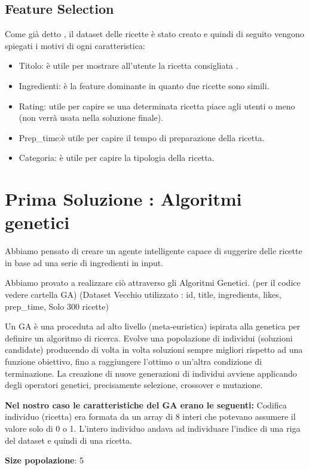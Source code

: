 \documentclass[12pt]{report}
\begin{document}
\section{Feature Selection}
Come già detto , il dataset delle ricette è stato creato e quindi di seguito vengono spiegati i motivi di ogni caratteristica:
\begin{itemize}
	\item Titolo: è utile per mostrare all’utente la ricetta consigliata .
	\item Ingredienti: è la feature dominante in quanto due ricette sono simili.
	\item Rating: utile per capire se una determinata ricetta piace agli utenti o meno (non verrà usata nella soluzione finale).
	\item Prep\_time:è utile per capire il tempo di preparazione della ricetta.
	\item Categoria: è utile per capire la tipologia della ricetta.
 \end{itemize}

\chapter{Prima Soluzione : Algoritmi genetici}

Abbiamo pensato di creare un agente intelligente capace di suggerire delle ricette in base ad una serie di ingredienti in input.

Abbiamo provato a realizzare ciò attraverso gli Algoritmi Genetici. (per il codice vedere cartella GA) (Dataset Vecchio utilizzato : id, title, ingredients, likes, prep\_time, Solo 300 ricette)

Un GA è una proceduta ad alto livello (meta-euristica) ispirata alla genetica per definire un algoritmo di ricerca. Evolve una popolazione di individui (soluzioni candidate) producendo di volta in volta soluzioni sempre migliori rispetto ad una funzione obiettivo, fino a raggiungere l’ottimo o un’altra condizione di terminazione. La creazione di nuove generazioni di individui avviene applicando degli operatori genetici, precisamente selezione, crossover e mutazione.

\textbf{Nel nostro caso le caratteristiche del GA erano le seguenti:}
Codifica individuo (ricetta) era formata da un array di 8 interi che potevano assumere il valore solo di 0 o 1. L’intero individuo andava ad individuare l’indice di una riga del dataset e quindi di una ricetta.

\textbf{Size popolazione}: 5
\end{document}
